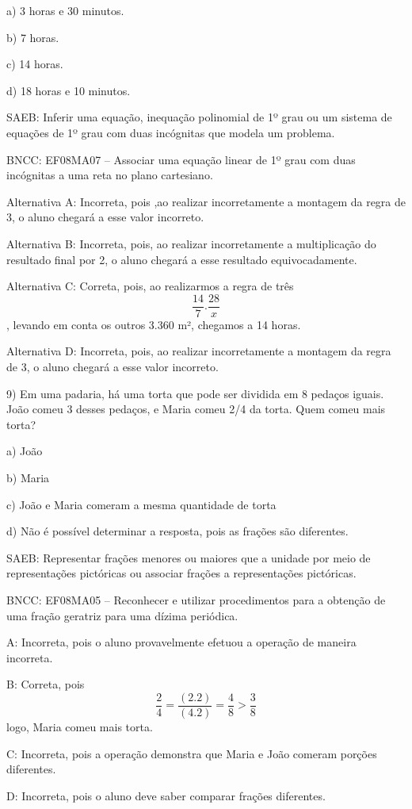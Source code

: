 a) 3 horas e 30 minutos.

b) 7 horas.

c) 14 horas.

d) 18 horas e 10 minutos.

SAEB: Inferir uma equação, inequação polinomial de 1º grau ou um sistema
de equações de 1º grau com duas incógnitas que modela um problema.

BNCC: EF08MA07 -- Associar uma equação linear de 1º grau com duas
incógnitas a uma reta no plano cartesiano.

Alternativa A: Incorreta, pois ,ao realizar incorretamente a montagem da
regra de 3, o aluno chegará a esse valor incorreto.

Alternativa B: Incorreta, pois, ao realizar incorretamente a
multiplicação do resultado final por 2, o aluno chegará a esse resultado
equivocadamente.

Alternativa C: Correta, pois, ao realizarmos a regra de três
\[\frac {14}{7} . \frac {28}{x}\], levando em conta os outros 3.360 m²,
chegamos a 14 horas.

Alternativa D: Incorreta, pois, ao realizar incorretamente a montagem da
regra de 3, o aluno chegará a esse valor incorreto.

9) Em uma padaria, há uma torta que pode ser dividida em 8 pedaços
iguais. João comeu 3 desses pedaços, e Maria comeu 2/4 da torta. Quem
comeu mais torta?

a) João

b) Maria

c) João e Maria comeram a mesma quantidade de torta

d) Não é possível determinar a resposta, pois as frações são diferentes.

SAEB: Representar frações menores ou maiores que a unidade por meio de
representações pictóricas ou associar frações a representações
pictóricas.

BNCC: EF08MA05 -- Reconhecer e utilizar procedimentos para a obtenção de
uma fração geratriz para uma dízima periódica.

A: Incorreta, pois o aluno provavelmente efetuou a operação de maneira
incorreta.

B: Correta, pois
\[\frac {2}{4} = \frac {(2 . 2)} {(4 . 2)} = \frac {4}{8} > \frac {3}{8}\]
logo, Maria comeu mais torta.

C: Incorreta, pois a operação demonstra que Maria e João comeram porções
diferentes.

D: Incorreta, pois o aluno deve saber comparar frações diferentes.


